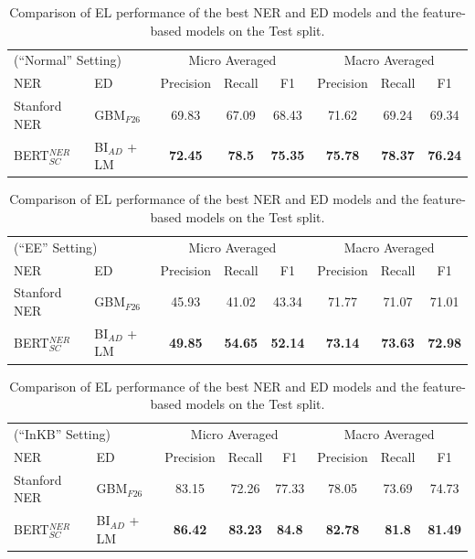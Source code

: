 \documentclass{report}
\theoremstyle{definition}
\theoremstyle{remark}
\begin{document}
\begin{table}
    \centering
    \begin{tabular}{l l c c c| c c c}
    \multicolumn{2}{l}{(``Normal'' Setting)}&\multicolumn{3}{c|}{Micro Averaged}&\multicolumn{3}{c}{Macro Averaged} \\
    NER & ED &Precision&Recall&F1&Precision&Recall&F1\\
    \hline
    Stanford NER& GBM$_{F26}$ & 69.83	&67.09&	68.43&	71.62&	69.24&	69.34
\\
    BERT$_{SC}^{NER}$ & BI$_{AD}$ + LM &\textbf{72.45}&\textbf{78.5}&\textbf{75.35}&\textbf{75.78}&\textbf{78.37}&\textbf{76.24} \\
    \end{tabular}
    
    \vspace{0.5cm}\begin{tabular}{l l c c c| c c c}
    \multicolumn{2}{l}{(``EE'' Setting)}&\multicolumn{3}{c|}{Micro Averaged}&\multicolumn{3}{c}{Macro Averaged} \\
    NER & ED &Precision&Recall&F1&Precision&Recall&F1\\
    \hline
    Stanford NER & GBM$_{F26}$ & 45.93&	41.02&	43.34&	71.77&	71.07	&71.01
\\
    BERT$_{SC}^{NER}$ & BI$_{AD}$ + LM &\textbf{49.85}&\textbf{54.65}&\textbf{52.14}&\textbf{73.14}&\textbf{73.63}&\textbf{72.98} \\
    \end{tabular}
    
    \vspace{0.5cm}\begin{tabular}{l l c c c| c c c}
    \multicolumn{2}{l}{(``InKB'' Setting)}&\multicolumn{3}{c|}{Micro Averaged}&\multicolumn{3}{c}{Macro Averaged} \\
    NER & ED &Precision&Recall&F1&Precision&Recall&F1\\
    \hline
    Stanford NER  & GBM$_{F26}$ & 83.15&	72.26&	77.33&	78.05&	73.69&	74.73
\\
    BERT$_{SC}^{NER}$ & BI$_{AD}$ + LM & \textbf{86.42}&\textbf{83.23}&\textbf{84.8}&\textbf{82.78}&\textbf{81.8}&\textbf{81.49} \\
    \end{tabular}
    \caption{Comparison of EL performance of the best NER and ED models and the feature-based models on the Test split.}
    \label{tab:elresultstest}
\end{table}
\end{document}
